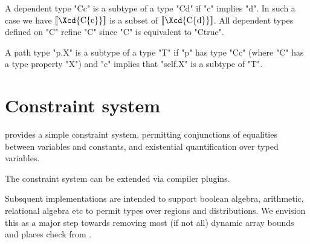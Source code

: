 A dependent type \xcd"C{c}" is a subtype of a type \xcd"C{d}" if
\xcd"c" implies \xcd"d".  In such a case we have
$\LL{\mbox{\Xcd{C\{c\}}}}$ is a
subset of $\LL{\mbox{\Xcd{C\{d\}}}}$. All dependent types defined on \xcd"C" refine
\xcd"C" since \xcd"C" is equivalent to \xcd"C{true}".


A path type \xcd"p.X" is a subtype of a type \xcd"T" if
\xcd"p" has type \xcd"C{c}" (where \xcd"C" has a type property
\xcd"X") and \xcd"c" implies that \xcd"self.X" is a subtype of \xcd"T".


\section{Constraint system}

\Xten{} provides a simple constraint system,  
permitting conjunctions of equalities between variables and
constants, and existential quantification over typed variables.

The constraint system can be extended via compiler plugins.

Subsquent implementations are intended to support boolean algebra,
arithmetic, relational algebra etc to permit types over regions and
distributions. We envision this as a major step towards removing most
(if not all) dynamic array bounds and places check from \Xten{}.







